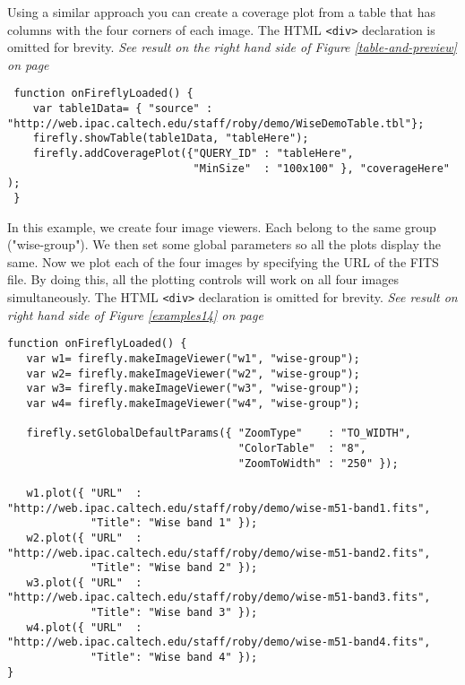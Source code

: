 Using a similar approach you can create a coverage plot from a table that has columns 
with the four corners of each image.
The HTML \scriptsize\texttt{<div>} \normalsize declaration is omitted for brevity. 
\small
\textit{See result on the right hand side of Figure \ref{table-and-preview} on page~\pageref{table-and-preview}}
\normalsize

\scriptsize
\begin{verbatim}
 function onFireflyLoaded() {
    var table1Data= { "source" : "http://web.ipac.caltech.edu/staff/roby/demo/WiseDemoTable.tbl"};
    firefly.showTable(table1Data, "tableHere");
    firefly.addCoveragePlot({"QUERY_ID" : "tableHere",
                             "MinSize"  : "100x100" }, "coverageHere" );
 }
\end{verbatim}
\normalsize

In this example, we create four image viewers. Each belong to the same group ("wise-group").  We then set some global parameters so all the plots display the same.  
Now we plot each of the four images by specifying the URL of the FITS file.  
By doing this, all the plotting controls will work on all four images simultaneously. 
The HTML \scriptsize\texttt{<div>} \normalsize declaration is omitted for brevity.
\small
\textit{See result on right hand side of Figure \ref{examples14} on page~\pageref{examples14}}
\normalsize
\scriptsize
\begin{verbatim}
function onFireflyLoaded() {
   var w1= firefly.makeImageViewer("w1", "wise-group");
   var w2= firefly.makeImageViewer("w2", "wise-group");
   var w3= firefly.makeImageViewer("w3", "wise-group");
   var w4= firefly.makeImageViewer("w4", "wise-group");

   firefly.setGlobalDefaultParams({ "ZoomType"    : "TO_WIDTH",
                                    "ColorTable"  : "8",
                                    "ZoomToWidth" : "250" });

   w1.plot({ "URL"  : "http://web.ipac.caltech.edu/staff/roby/demo/wise-m51-band1.fits",
             "Title": "Wise band 1" });
   w2.plot({ "URL"  : "http://web.ipac.caltech.edu/staff/roby/demo/wise-m51-band2.fits",
             "Title": "Wise band 2" });
   w3.plot({ "URL"  : "http://web.ipac.caltech.edu/staff/roby/demo/wise-m51-band3.fits",
             "Title": "Wise band 3" });
   w4.plot({ "URL"  : "http://web.ipac.caltech.edu/staff/roby/demo/wise-m51-band4.fits",
             "Title": "Wise band 4" });
}
\end{verbatim}
\normalsize



